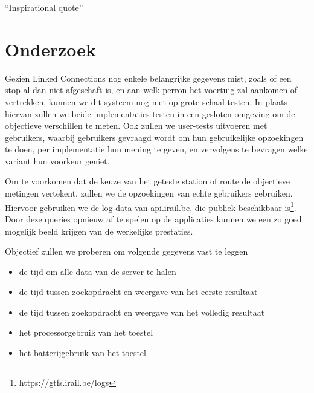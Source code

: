 \begin{savequote}[0.55\linewidth]
	``Inspirational quote''
\end{savequote}

\chapter{Onderzoek}
Gezien Linked Connections nog enkele belangrijke gegevens mist, zoals of een stop al dan niet afgeschaft is, en aan welk perron het voertuig zal aankomen of vertrekken, kunnen we dit systeem nog niet op grote schaal testen. In plaats hiervan zullen we beide implementaties testen in een gesloten omgeving om de objectieve verschillen te meten. Ook zullen we user-tests uitvoeren met gebruikers, waarbij gebruikers gevraagd wordt om hun gebruikelijke opzoekingen te doen, per implementatie hun mening te geven, en vervolgens te bevragen welke variant hun voorkeur geniet.

Om te voorkomen dat de keuze van het geteste station of route de objectieve metingen vertekent, zullen we de opzoekingen van echte gebruikers gebruiken. Hiervoor gebruiken we de log data van api.irail.be, die publiek beschikbaar is\footnote{https://gtfs.irail.be/logs}. Door deze queries opnieuw af te spelen op de applicaties kunnen we een zo goed mogelijk beeld krijgen van de werkelijke prestaties.

Objectief zullen we proberen om volgende gegevens vast te leggen
\begin{itemize}
	\item de tijd om alle data van de server te halen
	\item de tijd tussen zoekopdracht en weergave van het eerste resultaat
	\item de tijd tussen zoekopdracht en weergave van het volledig resultaat
	\item het processorgebruik van het toestel
	\item het batterijgebruik van het toestel
\end{itemize}